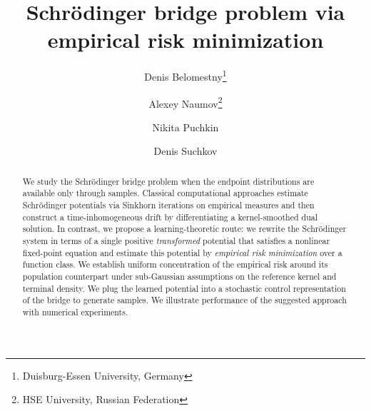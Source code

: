 \documentclass[11pt]{article}
\title{Schr\"odinger bridge problem via empirical risk minimization}
\author{
Denis Belomestny\thanks{Duisburg-Essen University, Germany}
\and
Alexey Naumov\thanks{HSE University, Russian Federation}
\and
Nikita Puchkin\footnotemark[2]
\and
Denis Suchkov \footnotemark[2]
}
\date{}
\theoremstyle{remark}
\numberwithin{equation}{section}
\begin{document}
\maketitle


\begin{abstract}
We study the Schr\"odinger bridge problem when the endpoint distributions are available only through samples. Classical computational approaches estimate Schr\"odinger potentials via Sinkhorn iterations on empirical measures and then construct a time-inhomogeneous drift by differentiating a kernel-smoothed dual solution. In contrast, we propose a learning-theoretic route: we rewrite the Schr\"odinger system in terms of a single positive \emph{transformed} potential that satisfies a nonlinear fixed-point equation and estimate this potential by \emph{empirical risk minimization} over a function class. We establish uniform concentration of the empirical risk around its population counterpart under sub-Gaussian assumptions on the reference kernel and terminal density. We plug the learned potential into a stochastic control representation of the bridge to generate samples. We illustrate performance of the suggested approach with numerical experiments.
\end{abstract}
\end{document}
